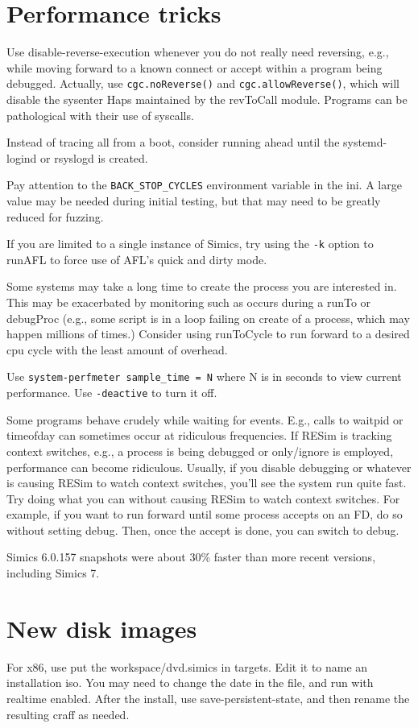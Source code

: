 \documentclass[titlepage]{article}
\begin{document}
\begin{appendices}
\section{Performance tricks}
Use disable-reverse-execution whenever you do not really need reversing, e.g., while moving forward to a known connect or accept
within a program being debugged.  Actually, use {\tt cgc.noReverse()} and {\tt cgc.allowReverse()}, which will disable the sysenter
Haps maintained by the revToCall module.  Programs can be pathological with their use of syscalls.

Instead of tracing all from a boot, consider running ahead until the systemd-logind or rsyslogd is created.

Pay attention to the {\tt BACK\_STOP\_CYCLES} environment variable in the ini.  A large value may be needed during initial testing,
but that may need to be greatly reduced for fuzzing.

If you are limited to a single instance of Simics, try using the {\tt -k} option to runAFL to force use of AFL's quick and dirty mode.

Some systems may take a long time to create the process you are interested in.  This may be exacerbated by monitoring such as occurs during
a runTo or debugProc (e.g., some script is in a loop failing on create of a process, which may happen millions of times.)  Consider using
runToCycle to run forward to a desired cpu cycle with the least amount of overhead.

Use {\tt system-perfmeter sample\_time = N} where N is in seconds to view current performance.  Use {\tt -deactive} to turn it off.

Some programs behave crudely while waiting for events.  E.g., calls to waitpid or timeofday can sometimes occur at ridiculous frequencies.
If RESim is tracking context switches, e.g., a process is being debugged or only/ignore is employed, performance can become ridiculous.
Usually, if you disable debugging or whatever is causing RESim to watch context switches, you'll see the system run quite fast.
Try doing what you can without causing RESim to watch context switches.  For example, if you want to run forward until some process accepts
on an FD, do so without setting debug.  Then, once the accept is done, you can switch to debug.

Simics 6.0.157 snapshots were about 30\% faster than more recent versions, including Simics 7.

\section{New disk images}
For x86, use put the workspace/dvd.simics in targets.  Edit it to name an installation iso.  You may need to change the date in
the file, and run with realtime enabled.  After the install, use save-persistent-state, and then rename the resulting craff as
needed.


\end{appendices}
\end{document}
